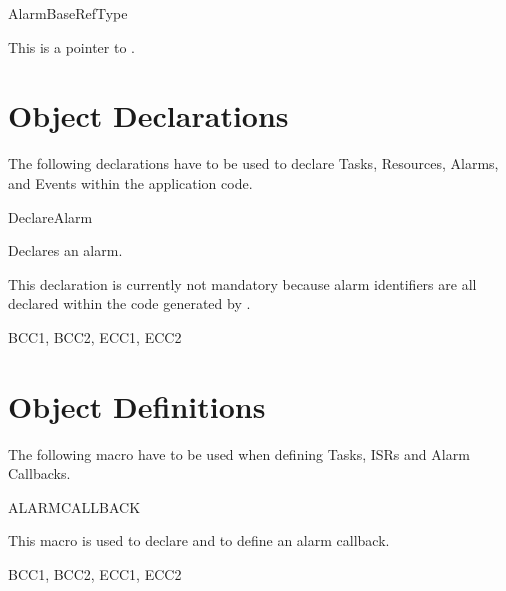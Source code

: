 \begin{type}{AlarmBaseRefType}
  \begin{typedescription}
    This is a pointer to .
  \end{typedescription}
\end{type}


\pagebreak









\section{Object Declarations}
The following declarations have to be used to declare Tasks, Resources,
Alarms, and Events within the application code.

\begin{function_nopb}{DeclareAlarm}
  \begin{fundescription}
    Declares an alarm.

    This declaration is currently not mandatory because alarm
    identifiers are all declared within the code generated by \rtd.
  \end{fundescription}
  \begin{funconformance}
    BCC1, BCC2, ECC1, ECC2
  \end{funconformance}
\end{function_nopb}


\pagebreak











\section{Object Definitions}
The following macro have to be used when defining Tasks, ISRs and
Alarm Callbacks.

\begin{function_nopb}{ALARMCALLBACK}
  \begin{fundescription}
    This macro is used to declare and to define an alarm callback.
  \end{fundescription}
  \begin{funparameters}
  \end{funparameters}
  \begin{funconformance}
    BCC1, BCC2, ECC1, ECC2
  \end{funconformance}
\end{function_nopb}

